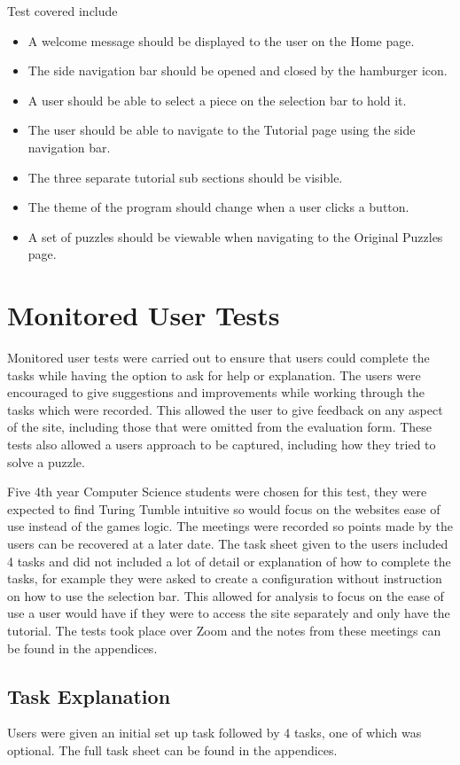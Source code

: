 \documentclass{l4proj}
\begin{document}
Test covered include 
\begin{itemize}
    \item A welcome message should be displayed to the user on the Home page.
    \item The side navigation bar should be opened and closed by the hamburger icon.
    \item A user should be able to select a piece on the selection bar to hold it.
    \item The user should be able to navigate to the Tutorial page using the side navigation bar.
    \item The three separate tutorial sub sections should be visible.
    \item The theme of the program should change when a user clicks a button.
    \item A set of puzzles should be viewable when navigating to the Original Puzzles page.
\end{itemize}

\section{Monitored User Tests}
Monitored user tests were carried out to ensure that users could complete the tasks while having the option to ask for help or explanation. The users were encouraged to give suggestions and improvements while working through the tasks which were recorded. This allowed the user to give feedback on any aspect of the site, including those that were omitted from the evaluation form. These tests also allowed a users approach to be captured, including how they tried to solve a puzzle. 

Five 4th year Computer Science students were chosen for this test, they were expected to find Turing Tumble intuitive so would focus on the websites ease of use instead of the games logic. The meetings were recorded so points made by the users can be recovered at a later date. The task sheet given to the users included 4 tasks and did not included a lot of detail or explanation of how to complete the tasks, for example they were asked to create a configuration without instruction on how to use the selection bar. This allowed for analysis to focus on the ease of use a user would have if they were to access the site separately and only have the tutorial. The tests took place over Zoom and the notes from these meetings can be found in the appendices.

\subsection{Task Explanation}
\label{taskExplanation}
Users were given an initial set up task followed by 4 tasks, one of which was optional. The full task sheet can be found in the appendices. 
\end{document}
